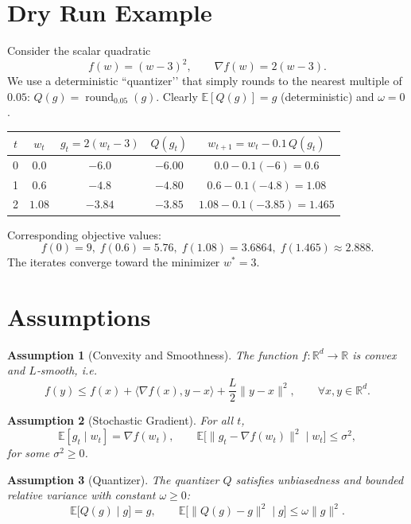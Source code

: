 \documentclass{article}
\newtheorem{assumption}{Assumption}
\newcommand{\E}{\mathbb{E}}
\newcommand{\R}{\mathbb{R}}
\begin{document}
\section*{Dry Run Example}
Consider the scalar quadratic
\[
f(w)=(w-3)^{2},\qquad \nabla f(w)=2(w-3).
\]
We use a deterministic “quantizer’’ that simply rounds to the nearest multiple of $0.05$:
\(Q(g)=\operatorname{round}_{0.05}(g)\).  
Clearly \(\E[Q(g)]=g\) (deterministic) and \(\omega=0\).

\begin{center}
\begin{tabular}{c|c|c|c|c}
$t$ & $w_{t}$ & $g_{t}=2(w_{t}-3)$ & $Q(g_{t})$ & $w_{t+1}=w_{t}-0.1\,Q(g_{t})$\\ \hline
0 & $0.0$ & $-6.0$ & $-6.00$ & $0.0-0.1(-6)=0.6$\\
1 & $0.6$ & $-4.8$ & $-4.80$ & $0.6-0.1(-4.8)=1.08$\\
2 & $1.08$ & $-3.84$ & $-3.85$ & $1.08-0.1(-3.85)=1.465$\\
\end{tabular}
\end{center}

Corresponding objective values:
\[
f(0)=9,\; f(0.6)=5.76,\; f(1.08)=3.6864,\; f(1.465)\approx2.888.
\]
The iterates converge toward the minimizer $w^{*}=3$.

\section*{Assumptions}
\begin{assumption}[Convexity and Smoothness]\label{ass:convex}
The function $f:\R^{d}\rightarrow\R$ is convex and $L$‑smooth, i.e.
\[
f(y)\le f(x)+\langle\nabla f(x),y-x\rangle+\frac{L}{2}\|y-x\|^{2},\qquad\forall x,y\in\R^{d}.
\]
\end{assumption}

\begin{assumption}[Stochastic Gradient]\label{ass:sgd}
For all $t$,
\[
\E[g_{t}\mid w_{t}]=\nabla f(w_{t}),\qquad
\E\big[\|g_{t}-\nabla f(w_{t})\|^{2}\mid w_{t}\big]\le\sigma^{2},
\]
for some $\sigma^{2}\ge0$.
\end{assumption}

\begin{assumption}[Quantizer]\label{ass:quant}
The quantizer $Q$ satisfies unbiasedness and bounded relative variance with constant $\omega\ge0$:
\[
\E\!\big[Q(g)\mid g\big]=g,\qquad 
\E\!\big[\|Q(g)-g\|^{2}\mid g\big]\le\omega\|g\|^{2}.
\]
\end{assumption}
\end{document}
